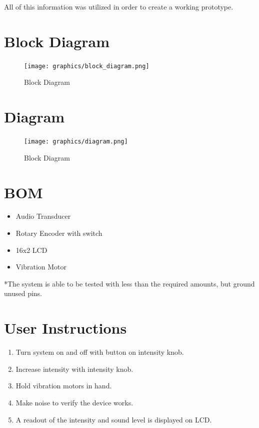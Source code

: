 \documentclass{article}
\begin{document}
All of this information was utilized in order to create a working prototype.


\section{Block Diagram}
    \begin{figure}[h!]
    \begin{center}
        \texttt{[image: graphics/block\_diagram.png]}
    \end{center}
    \caption{Block Diagram}
    \label{fig:Block}
    \end{figure}
\newpage
\section{Diagram}
\begin{figure}[h!]
    \begin{center}
        \texttt{[image: graphics/diagram.png]}
    \end{center}
    \caption{Block Diagram}
    \label{fig:Block}
\end{figure}

\section{BOM}
    \begin{itemize}
        \item Audio Transducer              \tab [x5]
        \item Rotary Encoder with switch    \tab [x1]
        \item 16x2 LCD                      \tab [x1] 
        \item Vibration Motor               \tab [x2] 
    \end{itemize}
    *The system is able to be tested with less than the required amounts, but ground unused pins.

\section{User Instructions}
\begin{enumerate}
    \item Turn system on and off with button on intensity knob.
    \item Increase intensity with intensity knob.
    \item Hold vibration motors in hand.
    \item Make noise to verify the device works.
    \item A readout of the intensity and sound level is displayed on LCD.
\end{enumerate}
\end{document}
